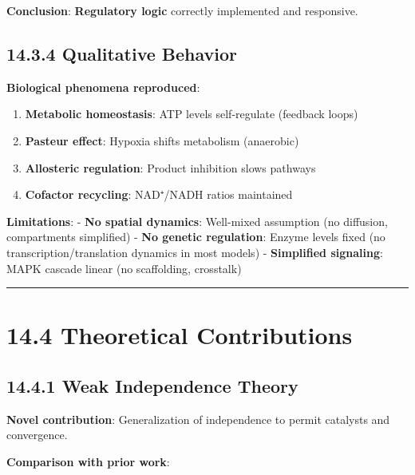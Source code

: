 \textbf{Conclusion}: \textbf{Regulatory logic} correctly implemented and
responsive.

\hypertarget{qualitative-behavior}{%
\subsection{14.3.4 Qualitative Behavior}\label{qualitative-behavior}}

\textbf{Biological phenomena reproduced}:

\begin{enumerate}
\def\labelenumi{\arabic{enumi}.}
\tightlist
\item
  \textbf{Metabolic homeostasis}: ATP levels self-regulate (feedback
  loops)
\item
  \textbf{Pasteur effect}: Hypoxia shifts metabolism (anaerobic)
\item
  \textbf{Allosteric regulation}: Product inhibition slows pathways
\item
  \textbf{Cofactor recycling}: NAD⁺/NADH ratios maintained
\end{enumerate}

\textbf{Limitations}: - \textbf{No spatial dynamics}: Well-mixed
assumption (no diffusion, compartments simplified) - \textbf{No genetic
regulation}: Enzyme levels fixed (no transcription/translation dynamics
in most models) - \textbf{Simplified signaling}: MAPK cascade linear (no
scaffolding, crosstalk)

\begin{center}\rule{0.5\linewidth}{0.5pt}\end{center}

\hypertarget{theoretical-contributions}{%
\section{14.4 Theoretical
Contributions}\label{theoretical-contributions}}

\hypertarget{weak-independence-theory}{%
\subsection{14.4.1 Weak Independence
Theory}\label{weak-independence-theory}}

\textbf{Novel contribution}: Generalization of independence to permit
catalysts and convergence.

\textbf{Comparison with prior work}:

